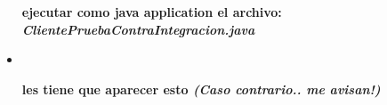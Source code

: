 \documentclass[12pt]{article}
\begin{document}
\begin{itemize}
\begin{minipage}[t]{\linewidth}
          \medskip
          \textbf{ejecutar como java application el archivo: \emph{ClientePruebaContraIntegracion.java}} 
    \end{minipage}
    \item \ \newline
    \begin{minipage}[t]{\linewidth}
          \raggedright

          \medskip
          \textbf{les tiene que aparecer esto \emph{(Caso contrario.. me avisan!)}} 
    \end{minipage}
\end{itemize}

\end{document}
